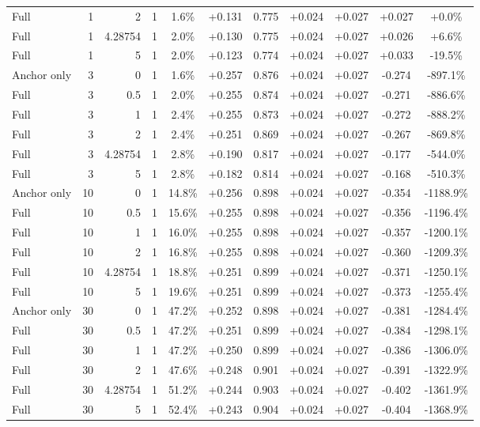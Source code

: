 \begin{table}[htbp]
\begin{tabular}{lrrrccccccc}
Full & 1 & 2 & 1 & 1.6\% & +0.131 & 0.775 & +0.024 & +0.027 & +0.027 & +0.0\% \\
Full & 1 & 4.28754 & 1 & 2.0\% & +0.130 & 0.775 & +0.024 & +0.027 & +0.026 & +6.6\% \\
Full & 1 & 5 & 1 & 2.0\% & +0.123 & 0.774 & +0.024 & +0.027 & +0.033 & -19.5\% \\
Anchor only & 3 & 0 & 1 & 1.6\% & +0.257 & 0.876 & +0.024 & +0.027 & -0.274 & -897.1\% \\
Full & 3 & 0.5 & 1 & 2.0\% & +0.255 & 0.874 & +0.024 & +0.027 & -0.271 & -886.6\% \\
Full & 3 & 1 & 1 & 2.4\% & +0.255 & 0.873 & +0.024 & +0.027 & -0.272 & -888.2\% \\
Full & 3 & 2 & 1 & 2.4\% & +0.251 & 0.869 & +0.024 & +0.027 & -0.267 & -869.8\% \\
Full & 3 & 4.28754 & 1 & 2.8\% & +0.190 & 0.817 & +0.024 & +0.027 & -0.177 & -544.0\% \\
Full & 3 & 5 & 1 & 2.8\% & +0.182 & 0.814 & +0.024 & +0.027 & -0.168 & -510.3\% \\
Anchor only & 10 & 0 & 1 & 14.8\% & +0.256 & 0.898 & +0.024 & +0.027 & -0.354 & -1188.9\% \\
Full & 10 & 0.5 & 1 & 15.6\% & +0.255 & 0.898 & +0.024 & +0.027 & -0.356 & -1196.4\% \\
Full & 10 & 1 & 1 & 16.0\% & +0.255 & 0.898 & +0.024 & +0.027 & -0.357 & -1200.1\% \\
Full & 10 & 2 & 1 & 16.8\% & +0.255 & 0.898 & +0.024 & +0.027 & -0.360 & -1209.3\% \\
Full & 10 & 4.28754 & 1 & 18.8\% & +0.251 & 0.899 & +0.024 & +0.027 & -0.371 & -1250.1\% \\
Full & 10 & 5 & 1 & 19.6\% & +0.251 & 0.899 & +0.024 & +0.027 & -0.373 & -1255.4\% \\
Anchor only & 30 & 0 & 1 & 47.2\% & +0.252 & 0.898 & +0.024 & +0.027 & -0.381 & -1284.4\% \\
Full & 30 & 0.5 & 1 & 47.2\% & +0.251 & 0.899 & +0.024 & +0.027 & -0.384 & -1298.1\% \\
Full & 30 & 1 & 1 & 47.2\% & +0.250 & 0.899 & +0.024 & +0.027 & -0.386 & -1306.0\% \\
Full & 30 & 2 & 1 & 47.6\% & +0.248 & 0.901 & +0.024 & +0.027 & -0.391 & -1322.9\% \\
Full & 30 & 4.28754 & 1 & 51.2\% & +0.244 & 0.903 & +0.024 & +0.027 & -0.402 & -1361.9\% \\
Full & 30 & 5 & 1 & 52.4\% & +0.243 & 0.904 & +0.024 & +0.027 & -0.404 & -1368.9\% \\

\end{tabular}
\end{table}

